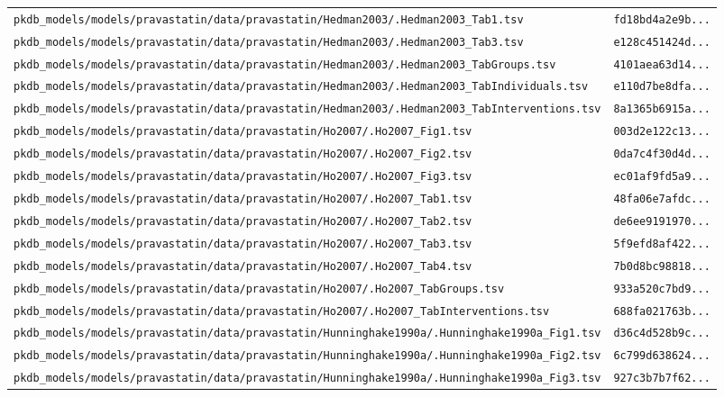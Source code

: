 \begin{longtable}{ll}
\texttt{pkdb\_models/models/pravastatin/data/pravastatin/Hedman2003/.Hedman2003\_Tab1.tsv} & \texttt{fd18bd4a2e9b...} \\
\texttt{pkdb\_models/models/pravastatin/data/pravastatin/Hedman2003/.Hedman2003\_Tab3.tsv} & \texttt{e128c451424d...} \\
\texttt{pkdb\_models/models/pravastatin/data/pravastatin/Hedman2003/.Hedman2003\_TabGroups.tsv} & \texttt{4101aea63d14...} \\
\texttt{pkdb\_models/models/pravastatin/data/pravastatin/Hedman2003/.Hedman2003\_TabIndividuals.tsv} & \texttt{e110d7be8dfa...} \\
\texttt{pkdb\_models/models/pravastatin/data/pravastatin/Hedman2003/.Hedman2003\_TabInterventions.tsv} & \texttt{8a1365b6915a...} \\
\texttt{pkdb\_models/models/pravastatin/data/pravastatin/Ho2007/.Ho2007\_Fig1.tsv} & \texttt{003d2e122c13...} \\
\texttt{pkdb\_models/models/pravastatin/data/pravastatin/Ho2007/.Ho2007\_Fig2.tsv} & \texttt{0da7c4f30d4d...} \\
\texttt{pkdb\_models/models/pravastatin/data/pravastatin/Ho2007/.Ho2007\_Fig3.tsv} & \texttt{ec01af9fd5a9...} \\
\texttt{pkdb\_models/models/pravastatin/data/pravastatin/Ho2007/.Ho2007\_Tab1.tsv} & \texttt{48fa06e7afdc...} \\
\texttt{pkdb\_models/models/pravastatin/data/pravastatin/Ho2007/.Ho2007\_Tab2.tsv} & \texttt{de6ee9191970...} \\
\texttt{pkdb\_models/models/pravastatin/data/pravastatin/Ho2007/.Ho2007\_Tab3.tsv} & \texttt{5f9efd8af422...} \\
\texttt{pkdb\_models/models/pravastatin/data/pravastatin/Ho2007/.Ho2007\_Tab4.tsv} & \texttt{7b0d8bc98818...} \\
\texttt{pkdb\_models/models/pravastatin/data/pravastatin/Ho2007/.Ho2007\_TabGroups.tsv} & \texttt{933a520c7bd9...} \\
\texttt{pkdb\_models/models/pravastatin/data/pravastatin/Ho2007/.Ho2007\_TabInterventions.tsv} & \texttt{688fa021763b...} \\
\texttt{pkdb\_models/models/pravastatin/data/pravastatin/Hunninghake1990a/.Hunninghake1990a\_Fig1.tsv} & \texttt{d36c4d528b9c...} \\
\texttt{pkdb\_models/models/pravastatin/data/pravastatin/Hunninghake1990a/.Hunninghake1990a\_Fig2.tsv} & \texttt{6c799d638624...} \\
\texttt{pkdb\_models/models/pravastatin/data/pravastatin/Hunninghake1990a/.Hunninghake1990a\_Fig3.tsv} & \texttt{927c3b7b7f62...} \\

\end{longtable}

